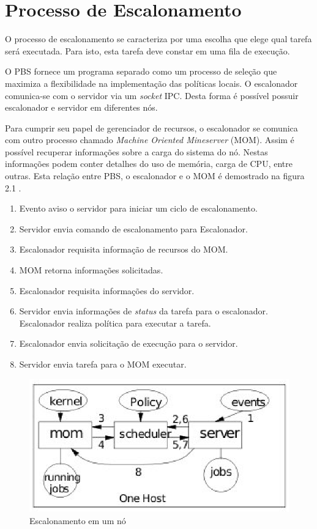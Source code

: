 \section{Processo de Escalonamento}

O processo de escalonamento se caracteriza por uma escolha que elege qual tarefa será executada. Para isto, esta tarefa deve constar em uma fila de execução.

O PBS fornece um programa separado como um processo de seleção que maximiza a flexibilidade na implementação das políticas locais. O escalonador comunica-se com o servidor via um \emph{socket} IPC. Desta forma é possível possuir escalonador e servidor em diferentes nós.

Para cumprir seu papel de gerenciador de recursos, o escalonador se comunica com outro processo chamado \emph{Machine Oriented Mineserver} (MOM). Assim é possível recuperar informações sobre a carga do sistema do nó. Nestas informações podem conter detalhes do uso de memória, carga de CPU, entre outras. Esta relação entre PBS, o escalonador e o MOM é demostrado na figura 2.1 \cite{Bayucan1998}.

\begin{center}
	\begin{enumerate}
		\item Evento aviso o servidor para iniciar um ciclo de escalonamento.
		\item Servidor envia comando de escalonamento para Escalonador.
		\item Escalonador requisita informação de recursos do MOM.
		\item MOM retorna informações solicitadas.
		\item Escalonador requisita informações do servidor.
		\item Servidor envia informações de \emph{status} da tarefa para o escalonador. Escalonador realiza política para executar a tarefa.
		\item Escalonador envia solicitação de execução para o servidor.
		\item Servidor envia tarefa para o MOM executar.
	\end{enumerate}
\end{center}

\begin{figure}[htb]
\begin{center}
\includegraphics[scale=0.9]{./img/PbsMom.eps}
\caption{Escalonamento em um nó}
\label{fig:Pbs_MOM}
\end{center}
\end{figure}

